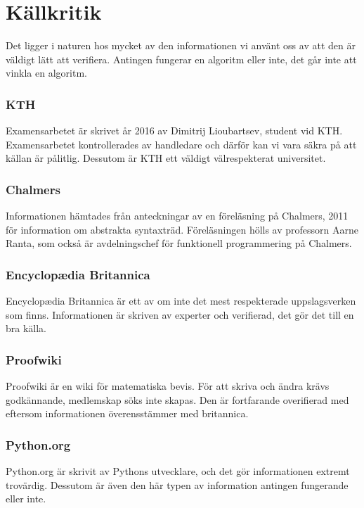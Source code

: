 \documentclass[12pt,a4paper]{article}
\begin{document}
\section{Källkritik}
Det ligger i naturen hos mycket av den informationen vi använt oss av att den är väldigt lätt att verifiera. Antingen fungerar en algoritm eller inte, det går inte att vinkla en algoritm. 
\subsubsection{KTH}
Examensarbetet är skrivet år 2016 av Dimitrij Lioubartsev, student vid KTH. Examensarbetet kontrollerades av handledare och därför kan vi vara säkra på att källan är pålitlig. Dessutom är KTH ett väldigt välrespekterat universitet.
\subsubsection{Chalmers}
Informationen hämtades från anteckningar av en föreläsning på Chalmers, 2011 för information om abstrakta syntaxträd. Föreläsningen hölls av professorn Aarne Ranta, som också är avdelningschef för funktionell programmering på Chalmers.
\subsubsection{Encyclopædia Britannica}
Encyclopædia Britannica är ett av om inte det mest respekterade uppslagsverken som finns. Informationen är skriven av experter och verifierad, det gör det till en bra källa. 
\subsubsection{Proofwiki}
Proofwiki är en wiki för matematiska bevis. För att skriva och ändra krävs godkännande, medlemskap söks inte skapas. Den är fortfarande overifierad med eftersom informationen överensstämmer med britannica.
\subsubsection{Python.org}
Python.org är skrivit av Pythons utvecklare, och det gör informationen extremt trovärdig. Dessutom är även den här typen av information antingen fungerande eller inte. 
\end{document}
